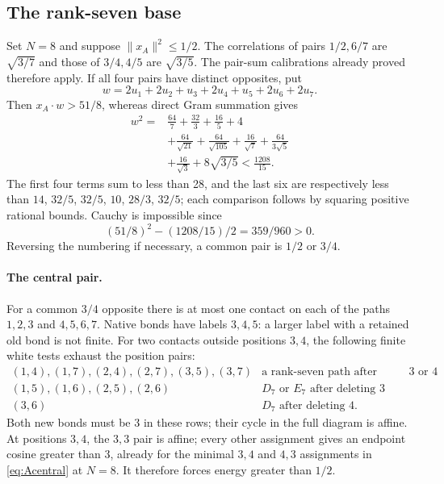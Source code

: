 \documentclass[11pt]{article}
\theoremstyle{remark}
\begin{document}
\subsection{The rank-seven base}\label{sec:A7base}

Set $N=8$ and suppose $\|x_A\|^2\le1/2$. The correlations of
pairs $1/2,6/7$ are $\sqrt{3/7}$ and those of $3/4,4/5$ are
$\sqrt{3/5}$. The pair-sum calibrations already proved therefore
apply. If all four pairs have distinct opposites, put
\[
 w=2u_1+2u_2+u_3+2u_4+u_5+2u_6+2u_7.
\]
Then $x_A\cdot w>51/8$, whereas direct Gram summation gives
\begin{align*}
 w^2={}&\frac{64}7+\frac{32}3+\frac{16}5+4
 \\
 &+\frac{64}{\sqrt{21}}+\frac{64}{\sqrt{105}}
 +\frac{16}{\sqrt7}+\frac{64}{3\sqrt5}\\
 &+\frac{16}{\sqrt3}+8\sqrt{3/5}<\frac{1208}{15}.
\end{align*}
The first four terms sum to less than 28, and the last six are
respectively less than $14$, $32/5$, $32/5$, $10$, $28/3$, $32/5$; each comparison
follows by squaring positive rational bounds. Cauchy is impossible
since
\[
(51/8)^2-(1208/15)/2=359/960>0.
\]
Reversing the numbering
if necessary, a common pair is $1/2$ or $3/4$.

\paragraph{The central pair.}
For a common $3/4$ opposite there is at most one contact on
each of the paths $1,2,3$ and $4,5,6,7$. Native bonds have labels
$3,4,5$: a larger label with a retained old bond is not finite.
For two contacts outside positions $3,4$, the following finite
white tests exhaust the position pairs:
\[
\begin{array}{c|l}
 (1,4),(1,7),(2,4),(2,7),(3,5),(3,7)&
       \text{a rank-seven path after deleting }3\text{ or }4\\
 (1,5),(1,6),(2,5),(2,6)&D_7\text{ or }E_7\text{ after deleting }3\\
 (3,6)&D_7\text{ after deleting }4 .
\end{array}
\]
Both new bonds must be 3 in these rows; their cycle in the full
diagram is affine. At positions $3,4$, the $3,3$ pair is affine;
every other assignment gives an endpoint cosine greater than 3,
already for the minimal $3,4$ and $4,3$ assignments in
\eqref{eq:Acentral} at $N=8$. It therefore forces energy greater
than $1/2$.
\end{document}
